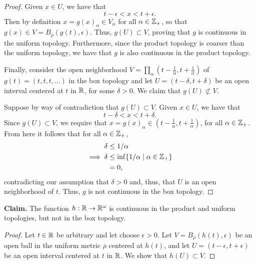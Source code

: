 \begin{solution}
\begin{proof}
        Given $x \in U$, we have that
        \begin{equation*}
            t - \epsilon < x < t + \epsilon.
        \end{equation*}
        Then by definition $x = g(x)_\alpha \in V_\alpha$ for all $\alpha \in \mathbb{Z}_+$, so that $g(x) \in V = B_{\overline{\rho}}(g(t), \epsilon)$.
        Thus, $g(U) \subset V$, proving that $g$ is continuous in the uniform topology.
        Furthermore, since the product topology is coarser than the uniform topology, we have that $g$ is also continuous in the product topology.

        Finally, consider the open neighborhood $V = \prod_\alpha (t - \tfrac{1}{\alpha}, t + \tfrac{1}{\alpha})$ of $g(t) = (t, t, t, \ldots)$ in the box topology and let $U = (t - \delta, t + \delta)$ be an open interval centered at $t$ in $\mathbb{R}$, for some $\delta > 0$.
        We claim that $g(U) \not\subset V$.

        Suppose by way of contradiction that $g(U) \subset V$.
        Given $x \in U$, we have that
        \begin{equation*}
            t - \delta < x < t + \delta.
        \end{equation*}
        Since $g(U) \subset V$, we require that $x = g(x)_\alpha \in (t - \tfrac{1}{\alpha}, t + \tfrac{1}{\alpha})$, for all $\alpha \in \mathbb{Z}_+$.
        From here it follows that for all $\alpha \in \mathbb{Z}_+$,
        \begin{align*}
            \delta          &\leq 1 / \alpha \\
            \implies \delta &\leq \inf\{1 / \alpha \mid \alpha \in \mathbb{Z}_+\} \\
                            &= 0,
        \end{align*}
        contradicting our assumption that $\delta > 0$ and, thus, that $U$ is an open neighborhood of $t$.
        Thus, $g$ is not continuous in the box topology.
    \end{proof}
    \bigskip

    \noindent\textbf{Claim.} The function $h: \mathbb{R} \rightarrow \mathbb{R}^\omega$ is continuous in the product and uniform topologies, but not in the box topology.
    \begin{proof}
        Let $t \in \mathbb{R}$ be arbitrary and let choose $\epsilon > 0$.
        Let $V = B_{\overline{\rho}}(h(t), \epsilon)$ be an open ball in the uniform metric $\overline{\rho}$ centered at $h(t)$, and let $U = (t - \epsilon, t + \epsilon)$ be an open interval centered at $t$ in $\mathbb{R}$.
        We show that $h(U) \subset V$.


\end{proof}
\end{solution}
